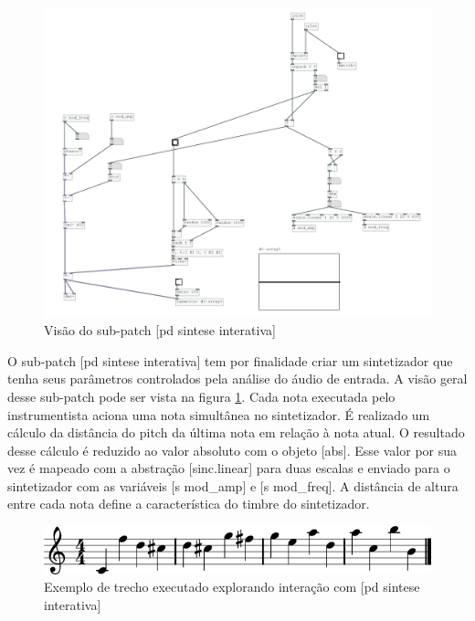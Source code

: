 \documentclass{ppgmus}
\begin{document}
\begin{figure}
\includegraphics[scale=.5]{sintese}
\caption{Visão do sub-patch [pd sintese interativa]}
\label{sintese}
\end{figure}

O sub-patch [pd sintese interativa] tem por finalidade criar um sintetizador que tenha
seus parâmetros controlados pela análise do áudio de entrada. A visão geral desse sub-patch pode
ser vista na figura \ref{sintese}.
Cada nota executada pelo
instrumentista aciona uma nota simultânea no sintetizador. É realizado um cálculo da distância
do pitch da última nota em relação à nota atual. O resultado desse cálculo é reduzido ao valor
absoluto com o objeto [abs]. Esse valor por sua vez é mapeado com a abstração [sinc.linear] para
duas escalas e enviado para o sintetizador com as variáveis [s mod\_amp] e [s mod\_freq].
A distância de altura entre cada nota define a característica do timbre do sintetizador.



\begin{figure}
\includegraphics[scale=.6]{part1}
\caption{Exemplo de trecho executado explorando interação com [pd sintese interativa]}
\label{part1}
\end{figure}
\end{document}
